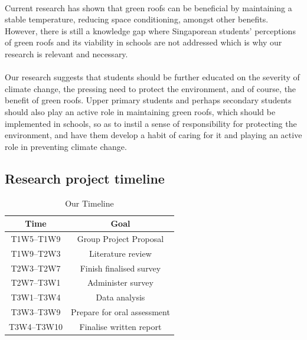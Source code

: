 \documentclass[a4paper]{article}
\begin{document}
\begin{multicols}{2}
  \paragraph{} Current research has shown that green roofs can be
  beneficial by maintaining a stable temperature, reducing space
  conditioning, amongst other benefits. However, there is still
  a knowledge gap where Singaporean students' perceptions of green
  roofs and its viability in schools are not addressed which is why our
  research is relevant and necessary.

  \paragraph{} Our research suggests that students should be further
  educated on the severity of climate change, the pressing need to protect
  the environment, and of course, the benefit of green roofs. Upper
  primary students and perhaps secondary students should also play an
  active role in maintaining green roofs, which should be implemented
  in schools, so as to instil a sense of responsibility for protecting
  the environment, and have them develop a habit of caring for it and
  playing an active role in preventing climate change.


\end{multicols}

\newpage

\printbibliography[heading=bibintoc,title={References}]

\newpage

\begin{appendices}
  \section{Research project timeline}
  \begin{table}[h!]
    \centering
    \caption{Our Timeline}
    \begin{tabular}{|c|c|}
      \hline
      \rowcolor{cyan}
      \textbf{Time} & \textbf{Goal} \\ \hline
      T1W5--T1W9 & Group Project Proposal \\ \hline
      \rowcolor{gray}
      T1W9--T2W3 & Literature review \\ \hline
      T2W3--T2W7 & Finish finalised survey \\ \hline
      \rowcolor{gray}
      T2W7--T3W1 & Administer survey \\ \hline
      T3W1--T3W4 & Data analysis \\ \hline
      \rowcolor{gray}
      T3W3--T3W9 & Prepare for oral assessment \\ \hline
      T3W4--T3W10 & Finalise written report \\ \hline
    \end{tabular}
    \label{tab:timeline}
  \end{table}
\end{appendices}
\end{document}
